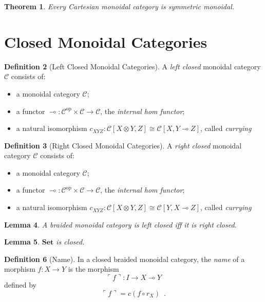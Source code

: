 \documentclass{book}
\newtheorem{lm}{Lemma}[chapter]
\newtheorem{thm}[lm]{Theorem}
\theoremstyle{definition}
\newtheorem{df}[lm]{Definition}
\newcommand{\Set}{\ensuremath{\mathbf{Set}}}
\newcommand{\op}[1]{\ensuremath{{#1}^{\mathrm{op}}}}
\begin{document}
  \begin{thm}
    Every Cartesian monoidal category is symmetric monoidal.
  \end{thm}
  
  \section{Closed Monoidal Categories}
  
  \begin{df}[Left Closed Monoidal Categories]
    A \emph{left closed} monoidal category $\mathcal{C}$ consists of:
    \begin{itemize}
      \item a monoidal category $\mathcal{C}$;
      \item a functor $\multimap : \op{\mathcal{C}} \times \mathcal{C} 
      \rightarrow 
      \mathcal{C}$, the \emph{internal hom functor};
      \item a natural isomorphism $c_{XYZ} : \mathcal{C}[X \otimes Y, Z] \cong 
      \mathcal{C}[X, Y \multimap Z]$, called \emph{currying}
    \end{itemize}
  \end{df}
  
  \begin{df}[Right Closed Monoidal Categories]
    A \emph{right closed} monoidal category $\mathcal{C}$ consists of:
    \begin{itemize}
      \item a monoidal category $\mathcal{C}$;
      \item a functor $\multimap : \op{\mathcal{C}} \times \mathcal{C} 
      \rightarrow 
      \mathcal{C}$, the \emph{internal hom functor};
      \item a natural isomorphism $c_{XYZ} : \mathcal{C}[X \otimes Y, Z] \cong 
      \mathcal{C}[Y, X \multimap Z]$, called \emph{currying}
    \end{itemize}
  \end{df}
  
  \begin{lm}
    A braided monoidal category is left closed iff it is right closed.
  \end{lm}
  
  \begin{lm}
    $\Set$ is closed.
  \end{lm}
  
  \begin{df}[Name]
    In a closed braided monoidal category, the \emph{name} of a morphism $f : X 
    \rightarrow Y$ is the morphism
    \[ \ulcorner f \urcorner : I \rightarrow X \multimap Y \]
    defined by
    \[ \ulcorner f \urcorner = c(f \circ r_X) \enspace . \]
  \end{df}
  
\end{document}
